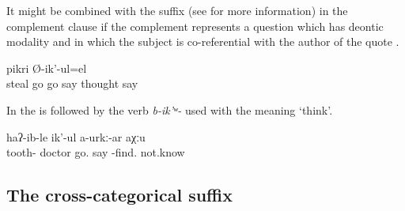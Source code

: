 It might be combined with the  suffix (see  for more information) in the complement clause if the complement represents a question which has deontic modality and in which the subject is co-referential with the author of the quote .
%
\begin{exe}
	\ex	\label{ex:(He) is probably thinking, Should I go stealing or should I not go?}
	\gll	[d-iʡ-ij	uq'-ide=l	a-w-q'-idel	Ø-ik'-ul]		pikri	Ø-ik'-ul=el\\
		steal	go	go	say	thought	say\\
	\glt	{}
\end{exe}


In  the   is followed by the verb 
\textit{b-ik'ʷ-} used with the meaning `think'. 

\begin{exe}
	\ex	\label{ex:‎‎‎‎I will become a dentist, he probably thinks, I do not know.}
	\gll	[cul-b-a-la	tuχtur	arg-an=da]	haʔ-ib-le	ik'-ul	a-urkː-ar	aχːu\\
		tooth-	doctor	go.	say	-find.	not.know\\
	\glt	{}
\end{exe}

	



\subsection{The cross-categorical suffix \protect{}}
\label{ssec:The attributive marker -ce (-te)COMPL}

